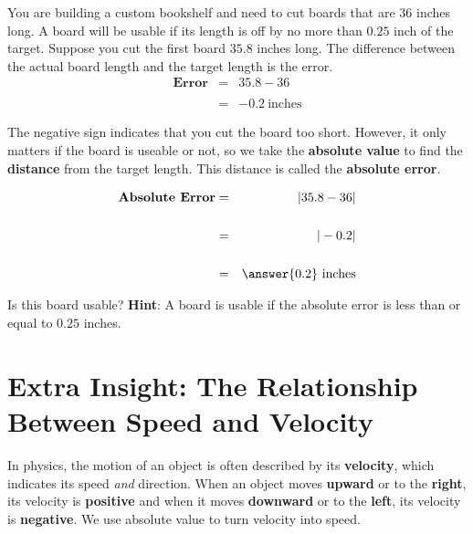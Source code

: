 \documentclass{ximera}[font=12pt]
\begin{document}
\begin{problem}
You are building a custom bookshelf and need to cut boards that are $36$ inches long.  A board will be usable if its 
length is off by no more than $0.25$ inch of the target.  Suppose you cut the first board $35.8$ inches long.  The 
difference between the actual board length and the target length is the error.
\begin{eqnarray*}
  \textbf{Error} &=& 35.8 - 36 \\
        & & \\
        &=& -0.2 \  \textrm{inches}
\end{eqnarray*}

The negative sign indicates that you cut the board too short.  However, it only matters if the board is useable or not, so we 
take the \textbf{absolute value} to find the \textbf{distance} from the target length.  This distance is called the \textbf{absolute error}.

\begin{eqnarray*}
\textbf{Absolute Error} &=& |35.8 - 36| \\
    & & \\
    &=& |-0.2| \\
    & & \\
    &=&  \answer{0.2} \ \textrm{inches}
\end{eqnarray*}

Is this board usable? \textbf{Hint}: A board is usable if the absolute error is less than or equal to $0.25$ inches.

\begin{multipleChoice}
\end{multipleChoice}


\end{problem}

\section*{Extra Insight:  The Relationship Between Speed and Velocity}

In physics, the motion of an object is often described by its \textbf{velocity}, which indicates its speed \emph{and} direction.  
When an object moves \textbf{upward} or to the \textbf{right}, its velocity is \textbf{positive} and when it moves 
\textbf{downward} or to the \textbf{left}, its velocity is \textbf{negative}.  We use
absolute value to turn velocity into speed.
\end{document}
